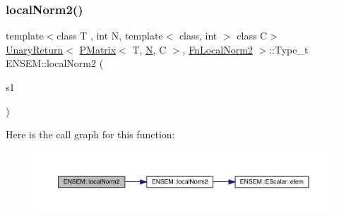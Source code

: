 \subsubsection{\texorpdfstring{localNorm2()}{localNorm2()}}
{\footnotesize\ttfamily template$<$class T , int N, template$<$ class, int $>$ class C$>$ \\
\mbox{\hyperlink{structENSEM_1_1UnaryReturn}{Unary\+Return}}$<$ \mbox{\hyperlink{classENSEM_1_1PMatrix}{P\+Matrix}}$<$ T, \mbox{\hyperlink{adat__devel_2lib_2hadron_2operator__name__util_8cc_a7722c8ecbb62d99aee7ce68b1752f337}{N}}, C $>$, \mbox{\hyperlink{structENSEM_1_1FnLocalNorm2}{Fn\+Local\+Norm2}} $>$\+::Type\+\_\+t E\+N\+S\+E\+M\+::local\+Norm2 (\begin{DoxyParamCaption}\item[{const \mbox{\hyperlink{classENSEM_1_1PMatrix}{P\+Matrix}}$<$ T, \mbox{\hyperlink{adat__devel_2lib_2hadron_2operator__name__util_8cc_a7722c8ecbb62d99aee7ce68b1752f337}{N}}, C $>$ \&}]{s1 }\end{DoxyParamCaption})\hspace{0.3cm}{\ttfamily [inline]}}

Here is the call graph for this function\+:\nopagebreak
\begin{figure}[H]
\begin{center}
\leavevmode
\includegraphics[width=350pt]{df/d0a/group__primmatrix_ga701b80e6864ced6a31a2abc314946f2f_cgraph}
\end{center}
\end{figure}
\mbox{\label{group__primmatrix_ga1635949cdf21523d1c8bdb6d5ada65a8}} 
